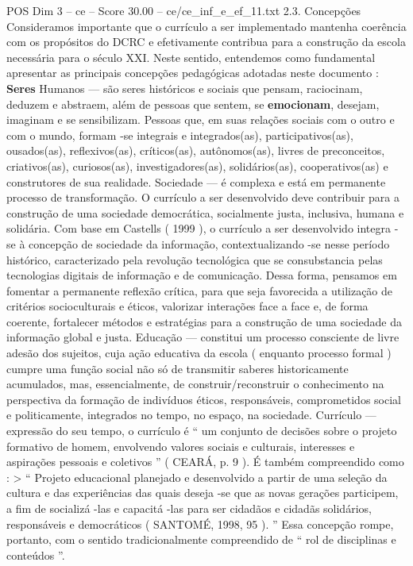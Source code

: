 \begin{textsample}{POS Dim 3 – ce – Score 30.00 – ce/ce\_inf\_e\_ef\_11.txt}  \label{ex:f3_pos_054}
2.3.
Concepções Consideramos importante que o currículo a ser implementado mantenha coerência com os propósitos do DCRC e efetivamente contribua para a construção da escola necessária para o século XXI.
Neste sentido, entendemos como fundamental apresentar as principais concepções pedagógicas adotadas neste documento : \textbf{Seres} Humanos — são seres históricos e sociais que pensam, raciocinam, deduzem e abstraem, além de pessoas que sentem, se \textbf{emocionam}, desejam, imaginam e se sensibilizam.
Pessoas que, em suas relações sociais com o outro e com o mundo, formam -se integrais e integrados(as), participativos(as), ousados(as), reflexivos(as), críticos(as), autônomos(as), livres de preconceitos, criativos(as), curiosos(as), investigadores(as), solidários(as), cooperativos(as) e construtores de sua realidade.
Sociedade — é complexa e está em permanente processo de transformação.
O currículo a ser desenvolvido deve contribuir para a construção de uma sociedade democrática, socialmente justa, inclusiva, humana e solidária.
Com base em Castells ( 1999 ), o currículo a ser desenvolvido integra -se à concepção de sociedade da informação, contextualizando -se nesse período histórico, caracterizado pela revolução tecnológica que se consubstancia pelas tecnologias digitais de informação e de comunicação.
Dessa forma, pensamos em fomentar a permanente reflexão crítica, para que seja favorecida a utilização de critérios socioculturais e éticos, valorizar interações face a face e, de forma coerente, fortalecer métodos e estratégias para a construção de uma sociedade da informação global e justa.
Educação — constitui um processo consciente de livre adesão dos sujeitos, cuja ação educativa da escola ( enquanto processo formal ) cumpre uma função social não só de transmitir saberes historicamente acumulados, mas, essencialmente, de construir/reconstruir o conhecimento na perspectiva da formação de indivíduos éticos, responsáveis, comprometidos social e politicamente, integrados no tempo, no espaço, na sociedade.
Currículo — expressão do seu tempo, o currículo é “ um conjunto de decisões sobre o projeto formativo de homem, envolvendo valores sociais e culturais, interesses e aspirações pessoais e coletivos ” ( CEARÁ, p. 9 ).
É também compreendido como : > “ Projeto educacional planejado e desenvolvido a partir de uma seleção da cultura e das experiências das quais deseja -se que as novas gerações participem, a fim de socializá -las e capacitá -las para ser cidadãos e cidadãs solidários, responsáveis e democráticos ( SANTOMÉ, 1998, 95 ). ” Essa concepção rompe, portanto, com o sentido tradicionalmente compreendido de “ rol de disciplinas e conteúdos ”.

\end{textsample}
